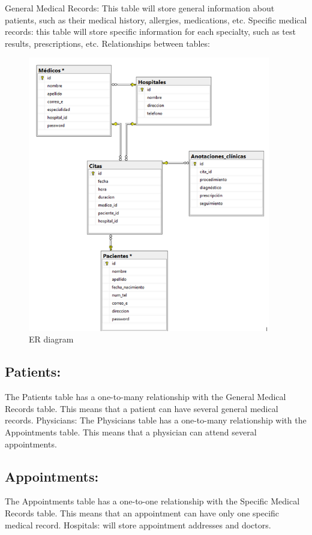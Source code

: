 \documentclass{scrreprt}
\begin{document}
	General Medical Records: This table will store general information about patients, such as their medical history, allergies, medications, etc.
	Specific medical records: this table will store specific information for each specialty, such as test results, prescriptions, etc.
	Relationships between tables:
	\begin{figure}[h]
		\centering
		\includegraphics[width=300pt]{entidadrelacion.png}
		\caption{ER diagram}
		\label{fig:ER}
	\end{figure}
	
	\pagebreak
	\subsection{Patients:}
	 The Patients table has a one-to-many relationship with the General Medical Records table. This means that a patient can have several general medical records.
	Physicians: The Physicians table has a one-to-many relationship with the Appointments table. This means that a physician can attend several appointments.
	
	\subsection{Appointments:}
	 The Appointments table has a one-to-one relationship with the Specific Medical Records table. This means that an appointment can have only one specific medical record.
	Hospitals: will store appointment addresses and doctors. 
	
\end{document}
